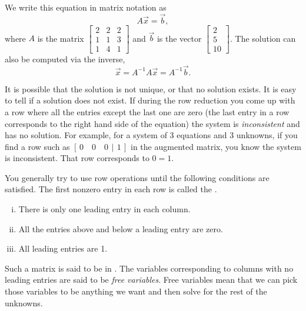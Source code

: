 We write this equation in matrix notation as
\begin{equation*}
A \vec{x} = \vec{b} ,
\end{equation*}
where $A$ is the matrix
$\left[ \begin{smallmatrix}
2 & 2 & 2 \\
1 & 1 & 3 \\
1 & 4 & 1 
\end{smallmatrix} \right]$ and $\vec{b}$ is the vector
$\left[ \begin{smallmatrix}
2 \\
5 \\
10
\end{smallmatrix} \right]$.  The solution can also be computed via the
inverse,
\begin{equation*}
\vec{x} = A^{-1} A \vec{x} = A^{-1} \vec{b} .
\end{equation*}

\medskip

It is
possible that the solution is not unique, or that no solution exists.
It is easy to tell if a solution does not exist.  If during the row
reduction you come up with a row where all the entries except the last one
are zero (the last entry in a row corresponds to the right hand side of the
equation) the system is \emph{inconsistent} and
has no solution.  For
example, for a system of 3 equations and 3 unknowns, if you find a row
such as $[\,0 \quad 0 \quad 0 ~\,|\,~ 1\,]$ in the augmented matrix,
you know the system is inconsistent.  That row corresponds to $0=1$.

\medskip

You generally try to use row operations until the following conditions
are satisfied.  The first nonzero entry in each row is called the
\emph{}.
\begin{enumerate}[(i)]
\item There is only one leading entry in each column.
\item All the entries above and below a leading entry are zero.
\item All leading entries are 1.
\end{enumerate}
Such a matrix is said to be in
\emph{}.  The variables
corresponding to columns with no leading entries are said to be
\emph{free variables}.
Free variables mean that we can pick those variables
to be anything we want and then solve for the rest of the unknowns.

